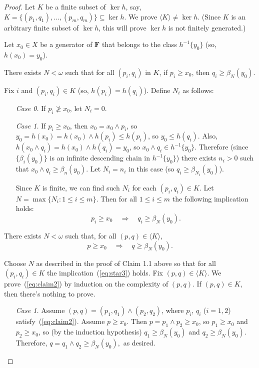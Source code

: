 \begin{proof}
Let $K$ be a finite subset of $\ker h$, say, $K = \{(p_1, q_1), \dots, (p_{m}, q_{m})\} \subseteq \ker h$.
We prove $\langle K \rangle \neq \ker h$. (Since $K$ is an arbitrary finite subset of $\ker h$, this will prove $\ker h$ is not finitely generated.)

Let $x_0\in X$ be a generator of $\mathbf F$ that belongs to the class $h^{-1}\{y_0\}$ (so, $h(x_0) = y_0$).

\medskip

 There exists $N<\omega$ such that for all $(p_i, q_i)$ in $K$, if $p_i \geqslant x_0$, then $q_i \geqslant \beta_N (y_0)$.

Fix $i$ and $(p_i, q_i) \in K$ (so, $h(p_i) = h(q_i)$). Define $N_i$ as follows:
\begin{itemize}
\item[{\it Case 0.}] If $p_i \ngeqslant x_0$, let $N_i = 0$.  
\item[{\it Case 1.}] If $p_i\geqslant x_0$, then $x_0 = x_0\wedge p_i$, so $y_0 = h(x_0) = h(x_0) \wedge h(p_i) \leqslant h(p_i)$, so $y_0\leqslant h(q_i)$. Also, $h(x_0 \wedge q_i) = h(x_0) \wedge h(q_i) = y_0$, so $x_0\wedge q_i \in h^{-1}\{y_0\}$. Therefore (since $\{\beta_i(y_0)\}$ is an infinite descending chain in $h^{-1}\{y_0\}$) there exists $n_i>0$ such that $x_0 \wedge q_i \geqslant\beta_{n}(y_0)$. Let $N_i = n_i$ in this case (so $q_i \geqslant \beta_{N_i}(y_0)$).

\noindent Since $K$ is finite, we can find such $N_i$ for each $(p_i,q_i) \in K$. Let $N = \max\{N_i : 1 \leqslant i \leqslant m\}$.
Then for all $1\leqslant i \leqslant m$ the following implication holds:
\begin{equation}
\label{eq:star3}    
p_i \geqslant x_0 \quad \Longrightarrow \quad q_i \geqslant \beta_N(y_0).
\end{equation}
\end{itemize}

\medskip

 There exists $N < \omega$ such that, for all $(p, q) \in \langle K \rangle$,
\begin{equation}
  \label{eq:claim2}
p \geqslant x_0 \quad \Longrightarrow \quad q \geqslant \beta_N(y_0).
\end{equation}

  Choose $N$ as described in the proof of Claim 1.1 above so that 
for all $(p_i,q_i) \in K$ the implication~(\ref{eq:star3}) holds. Fix $(p, q) \in \langle K \rangle$. We prove~(\ref{eq:claim2}) by induction on the complexity of $(p, q)$.  If $(p, q) \in K$, then there's nothing to prove.
\begin{itemize}
\item[{\it Case 1.}] Assume $(p, q) = (p_1, q_1) \wedge (p_2, q_2)$, where $p_i$, $q_i$ ($i = 1, 2$) satisfy~(\ref{eq:claim2}).  Assume $p\geqslant x_0$. %
  Then $p = p_1 \wedge p_2 \geqslant x_0$, so $p_1 \geqslant x_0$ and $p_2 \geqslant x_0$, so (by the induction hypothesis) $q_1\geqslant \beta_N(y_0)$ and $q_2\geqslant \beta_N(y_0).$ Therefore, $q = q_1 \wedge q_2 \geqslant \beta_N(y_0),$ as desired.


\end{itemize}
\end{proof}
